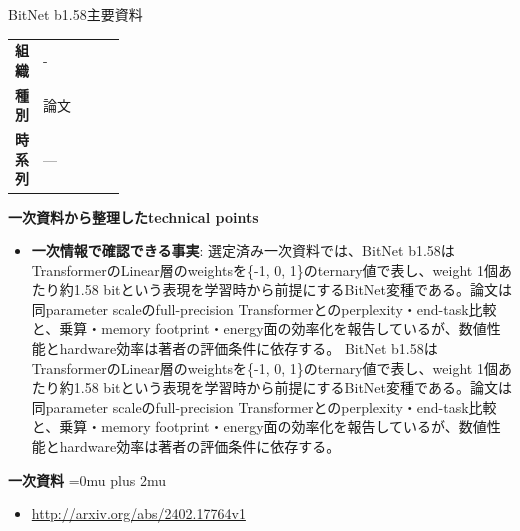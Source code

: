 \begin{technicalnote}{BitNet b1.58}{主要資料}
\begingroup
\begin{tabularx}{\linewidth}{@{}>{\bfseries}p{0.22\linewidth}X@{}}
組織 & - \\
種別 & 論文 \\
時系列 & — \\
\end{tabularx}
\smallskip
\begin{minipage}{\linewidth}
{\bfseries 一次資料から整理したtechnical points}
\begin{itemize}[leftmargin=1.5em,itemsep=0.35em]
\item \textbf{一次情報で確認できる事実}: 選定済み一次資料では、BitNet b1.58はTransformerのLinear層のweightsを\{-1, 0, 1\}のternary値で表し、weight 1個あたり約1.58 bitという表現を学習時から前提にするBitNet変種である。論文は同parameter scaleのfull-precision Transformerとのperplexity・end-task比較と、乗算・memory footprint・energy面の効率化を報告しているが、数値性能とhardware効率は著者の評価条件に依存する。 BitNet b1.58はTransformerのLinear層のweightsを\{-1, 0, 1\}のternary値で表し、weight 1個あたり約1.58 bitという表現を学習時から前提にするBitNet変種である。論文は同parameter scaleのfull-precision Transformerとのperplexity・end-task比較と、乗算・memory footprint・energy面の効率化を報告しているが、数値性能とhardware効率は著者の評価条件に依存する。
\end{itemize}
\begin{minipage}{\linewidth}
\begin{samepage}
{\bfseries 一次資料}
\begingroup\sloppy
\Urlmuskip=0mu plus 2mu\relax
\begin{itemize}[leftmargin=1.5em,itemsep=0.25em]
\item {\scriptsize\url{http://arxiv.org/abs/2402.17764v1}}
\end{itemize}
\endgroup
\end{samepage}
\end{minipage}
\end{minipage}
\endgroup
\end{technicalnote}
\medskip

